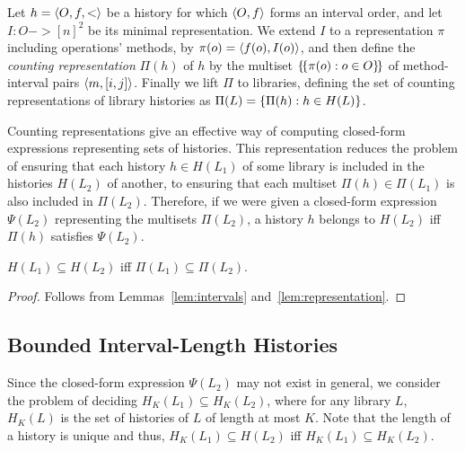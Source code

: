 
Let $h = \left\langle {O,f,<} \right\rangle$ be a history for which $\left\langle {O,f} \right\rangle$ forms an interval
order, and let $I : O -> [n]^2$ be its minimal representation. We extend $I$ to
a representation $\pi$ including operations' methods, by $\pi(o) =
\left\langle {f(o),I(o)} \right\rangle$, and then define the \emph{counting representation} $\Pi(h)$
of $h$ by the multiset ${\{\!\{  \pi(o) : o \in O  \}\!\}}$ of method-interval pairs
$\left\langle {m,[i,j]} \right\rangle$. Finally we lift $\Pi$ to libraries, defining the set of
counting representations of library histories as $\Pi(L) = {\{  \Pi(h) : h \in
H(L)  \}}$.


Counting representations give an effective way 
of computing closed-form expressions representing sets of histories. 
%
This representation reduces the problem of ensuring that each history $h \in
H(L_1)$ of some library is included in the histories $H(L_2)$ of another, to
ensuring that each multiset $\Pi(h) \in \Pi(L_1)$ is also included in
$\Pi(L_2)$. 
%
Therefore, if we were given a closed-form expression $\Psi(L_2)$ representing the 
multisets $\Pi(L_2)$, a history $h$ belongs to $H(L_2)$ iff $\Pi(h)$ satisfies $\Psi(L_2)$.


\begin{lemma}

  $H(L_1) \subseteq H(L_2)$ iff $\Pi(L_1) \subseteq \Pi(L_2)$.

\end{lemma}

\begin{proof}

  Follows from Lemmas~\ref{lem:intervals} and~\ref{lem:representation}.

\end{proof}

\subsection{Bounded Interval-Length Histories}
\label{sec:counting:bounding}

Since the closed-form expression $\Psi(L_2)$ may not exist in general, we
consider the problem of deciding $H_K(L_1) \subseteq H_K(L_2)$, where for any
library $L$, $H_K(L)$ is the set of histories of $L$ of length at most $K$.
Note that the length of a history is unique and thus, $H_K(L_1) \subseteq
H(L_2)$ iff $H_K(L_1) \subseteq H_K(L_2)$.

